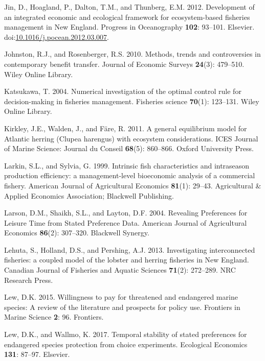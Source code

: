 \documentclass[]{article}
\begin{document}
\hypertarget{ref-Jin2012DevelopmentEngland}{}
Jin, D., Hoagland, P., Dalton, T.M., and Thunberg, E.M. 2012.
Development of an integrated economic and ecological framework for
ecosystem-based fisheries management in New England. Progress in
Oceanography \textbf{102}: 93--101. Elsevier.
doi:\href{https://doi.org/10.1016/j.pocean.2012.03.007}{10.1016/j.pocean.2012.03.007}.

\hypertarget{ref-johnston2010methods}{}
Johnston, R.J., and Rosenberger, R.S. 2010. Methods, trends and
controversies in contemporary benefit transfer. Journal of Economic
Surveys \textbf{24}(3): 479--510. Wiley Online Library.

\hypertarget{ref-katsukawa2004numerical}{}
Katsukawa, T. 2004. Numerical investigation of the optimal control rule
for decision-making in fisheries management. Fisheries science
\textbf{70}(1): 123--131. Wiley Online Library.

\hypertarget{ref-Kirkley2011AConsiderations}{}
Kirkley, J.E., Walden, J., and Färe, R. 2011. A general equilibrium
model for Atlantic herring (Clupea harengus) with ecosystem
considerations. ICES Journal of Marine Science: Journal du Conseil
\textbf{68}(5): 860--866. Oxford University Press.

\hypertarget{ref-Larkin1999IntrinsicFishery}{}
Larkin, S.L., and Sylvia, G. 1999. Intrinsic fish characteristics and
intraseason production efficiency: a management-level bioeconomic
analysis of a commercial fishery. American Journal of Agricultural
Economics \textbf{81}(1): 29--43. Agricultural \& Applied Economics
Association; Blackwell Publishing.

\hypertarget{ref-Larson2004RevealingData}{}
Larson, D.M., Shaikh, S.L., and Layton, D.F. 2004. Revealing Preferences
for Leisure Time from Stated Preference Data. American Journal of
Agricultural Economics \textbf{86}(2): 307--320. Blackwell Synergy.

\hypertarget{ref-Lehuta2013InvestigatingEngland}{}
Lehuta, S., Holland, D.S., and Pershing, A.J. 2013. Investigating
interconnected fisheries: a coupled model of the lobster and herring
fisheries in New England. Canadian Journal of Fisheries and Aquatic
Sciences \textbf{71}(2): 272--289. NRC Research Press.

\hypertarget{ref-lew2015willingness}{}
Lew, D.K. 2015. Willingness to pay for threatened and endangered marine
species: A review of the literature and prospects for policy use.
Frontiers in Marine Science \textbf{2}: 96. Frontiers.

\hypertarget{ref-lew2017temporal}{}
Lew, D.K., and Wallmo, K. 2017. Temporal stability of stated preferences
for endangered species protection from choice experiments. Ecological
Economics \textbf{131}: 87--97. Elsevier.
\end{document}
